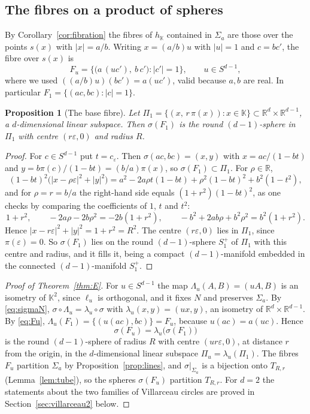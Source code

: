 \documentclass[11pt]{amsart}
\numberwithin{equation}{section}
\theoremstyle{plain}
\newtheorem{proposition}[theorem]{Proposition}
\theoremstyle{definition}
\theoremstyle{remark}
\newcommand{\R}{\mathbb{R}}
\newcommand{\K}{\mathbb{K}}
\begin{document}
\subsection{The fibres on a product of spheres}\label{sec:villfibres}

By Corollary~\ref{cor:fibration} the fibres of $h_\K$ contained in $\Sigma_a$ are those over the points $s(x)$ with $|x|=a/b$. Writing $x=(a/b)u$ with $|u|=1$ and $c=bc'$, the fibre over $s(x)$ is
\begin{equation}\label{eq:Fu}
F_u=\bigl\{\bigl(a\,(uc'),\ b\,c'\bigr):|c'|=1\bigr\},\qquad u\in S^{d-1},
\end{equation}
where we used $((a/b)u)(bc')=a(uc')$, valid because $a,b$ are real. In particular $F_1=\{(ac,bc):|c|=1\}$.

\begin{proposition}[The base fibre]\label{prop:basefibre}
Let $\Pi_1=\{(x,\,r\,\pi(x)):x\in\K\}\subset\R^d\times\R^{d-1}$, a $d$-dimensional linear subspace. Then $\sigma(F_1)$ is the round $(d-1)$-sphere in $\Pi_1$ with centre $(r\varepsilon,0)$ and radius $R$.
\end{proposition}

\begin{proof}
For $c\in S^{d-1}$ put $t=c_\varepsilon$. Then $\sigma(ac,bc)=(x,y)$ with $x=ac/(1-bt)$ and $y=b\pi(c)/(1-bt)=(b/a)\pi(x)$, so $\sigma(F_1)\subset\Pi_1$. For $\rho\in\R$,
\[
(1-bt)^2\bigl(|x-\rho\varepsilon|^2+|y|^2\bigr)=a^2-2a\rho t(1-bt)+\rho^2(1-bt)^2+b^2(1-t^2),
\]
and for $\rho=r=b/a$ the right-hand side equals $(1+r^2)(1-bt)^2$, as one checks by comparing the coefficients of $1$, $t$ and $t^2$:
\[
1+r^2,\qquad -2a\rho-2b\rho^2=-2b(1+r^2),\qquad -b^2+2ab\rho+b^2\rho^2=b^2(1+r^2).
\]
Hence $|x-r\varepsilon|^2+|y|^2=1+r^2=R^2$. The centre $(r\varepsilon,0)$ lies in $\Pi_1$, since $\pi(\varepsilon)=0$. So $\sigma(F_1)$ lies on the round $(d-1)$-sphere $S_1^+$ of $\Pi_1$ with this centre and radius, and it fills it, being a compact $(d-1)$-manifold embedded in the connected $(d-1)$-manifold $S_1^+$.
\end{proof}

\begin{proof}[Proof of Theorem~\ref{thm:E}]
For $u\in S^{d-1}$ the map $\Lambda_u(A,B)=(uA,B)$ is an isometry of $\K^2$, since $\ell_u$ is orthogonal, and it fixes $N$ and preserves $\Sigma_a$. By \eqref{eq:sigmaN}, $\sigma\circ\Lambda_u=\lambda_u\circ\sigma$ with $\lambda_u(x,y)=(ux,y)$, an isometry of $\R^d\times\R^{d-1}$. By \eqref{eq:Fu}, $\Lambda_u(F_1)=\{(u(ac),bc)\}=F_u$, because $u(ac)=a(uc)$. Hence
\[
\sigma(F_u)=\lambda_u\bigl(\sigma(F_1)\bigr)
\]
is the round $(d-1)$-sphere of radius $R$ with centre $(ur\varepsilon,0)$, at distance $r$ from the origin, in the $d$-dimensional linear subspace $\Pi_u=\lambda_u(\Pi_1)$. The fibres $F_u$ partition $\Sigma_a$ by Proposition~\ref{prop:lines}, and $\sigma|_{\Sigma_a}$ is a bijection onto $T_{R,r}$ (Lemma~\ref{lem:tube}), so the spheres $\sigma(F_u)$ partition $T_{R,r}$. For $d=2$ the statements about the two families of Villarceau circles are proved in Section~\ref{sec:villarceau2} below.
\end{proof}
\end{document}
